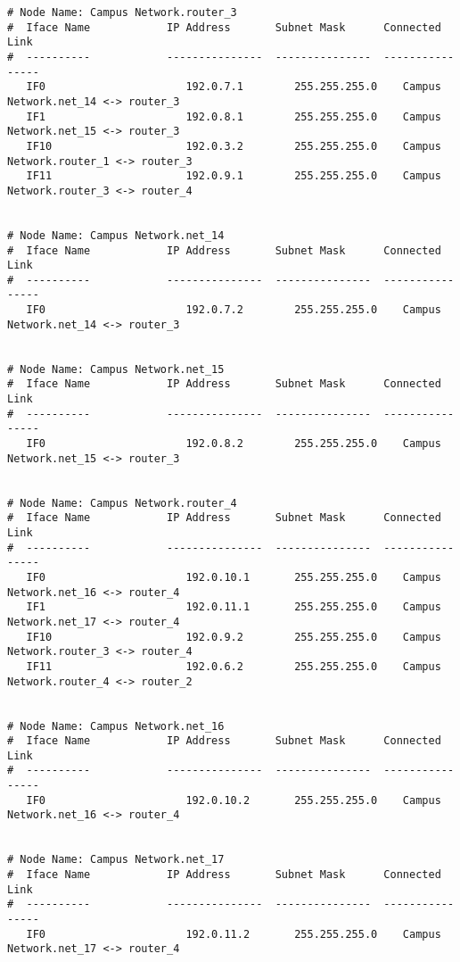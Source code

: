 \documentclass[a4paper]{article}
\begin{document}
\begin{lstlisting}
# Node Name: Campus Network.router_3
#  Iface Name            IP Address       Subnet Mask      Connected Link
#  ----------            ---------------  ---------------  ----------------
   IF0                      192.0.7.1        255.255.255.0    Campus Network.net_14 <-> router_3
   IF1                      192.0.8.1        255.255.255.0    Campus Network.net_15 <-> router_3
   IF10                     192.0.3.2        255.255.255.0    Campus Network.router_1 <-> router_3
   IF11                     192.0.9.1        255.255.255.0    Campus Network.router_3 <-> router_4


# Node Name: Campus Network.net_14
#  Iface Name            IP Address       Subnet Mask      Connected Link
#  ----------            ---------------  ---------------  ----------------
   IF0                      192.0.7.2        255.255.255.0    Campus Network.net_14 <-> router_3


# Node Name: Campus Network.net_15
#  Iface Name            IP Address       Subnet Mask      Connected Link
#  ----------            ---------------  ---------------  ----------------
   IF0                      192.0.8.2        255.255.255.0    Campus Network.net_15 <-> router_3


# Node Name: Campus Network.router_4
#  Iface Name            IP Address       Subnet Mask      Connected Link
#  ----------            ---------------  ---------------  ----------------
   IF0                      192.0.10.1       255.255.255.0    Campus Network.net_16 <-> router_4
   IF1                      192.0.11.1       255.255.255.0    Campus Network.net_17 <-> router_4
   IF10                     192.0.9.2        255.255.255.0    Campus Network.router_3 <-> router_4
   IF11                     192.0.6.2        255.255.255.0    Campus Network.router_4 <-> router_2


# Node Name: Campus Network.net_16
#  Iface Name            IP Address       Subnet Mask      Connected Link
#  ----------            ---------------  ---------------  ----------------
   IF0                      192.0.10.2       255.255.255.0    Campus Network.net_16 <-> router_4


# Node Name: Campus Network.net_17
#  Iface Name            IP Address       Subnet Mask      Connected Link
#  ----------            ---------------  ---------------  ----------------
   IF0                      192.0.11.2       255.255.255.0    Campus Network.net_17 <-> router_4
\end{lstlisting}
\end{document}
